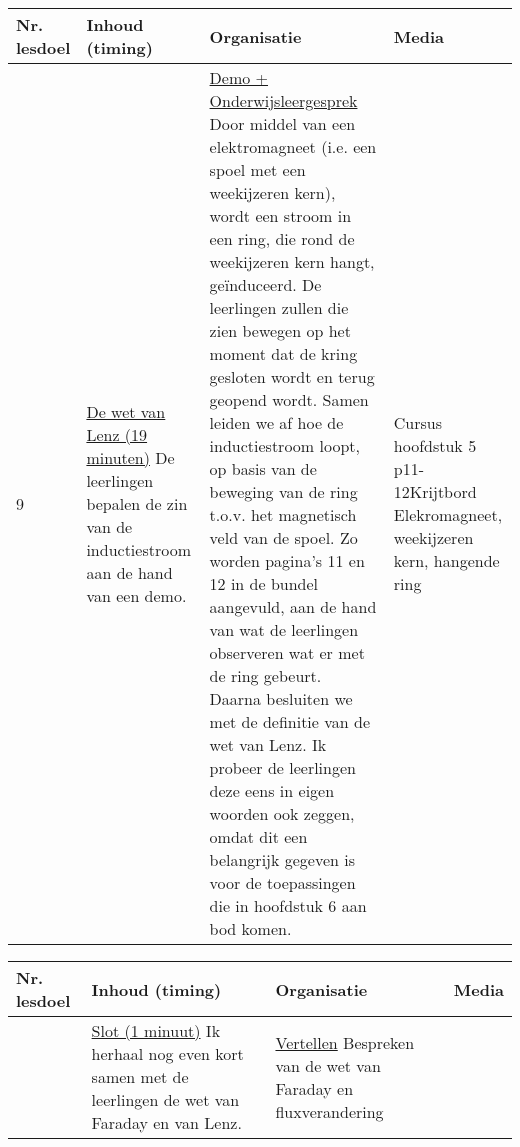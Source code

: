 \begin{landscape}
\begin{tabularx}{1.56\textwidth}{|p{1.5cm}|p{8cm}|X|p{4cm}|}
	\hline
	\textbf{Nr. lesdoel } & \textbf{Inhoud (timing)}  & \textbf{Organisatie } & \textbf{Media } \\ \hline
	9\newline\newline 10&\underline{De wet van Lenz (19 minuten)}\newline
	De leerlingen bepalen de zin van de inductiestroom  aan de hand van een demo.
	&  \underline{Demo + Onderwijsleergesprek}\newline 
	Door middel van een elektromagneet (i.e. een spoel met een weekijzeren kern), wordt een stroom  in een ring, die rond de weekijzeren kern hangt, geïnduceerd. De leerlingen zullen die zien bewegen op het moment dat de kring gesloten wordt en terug geopend wordt. Samen leiden we af hoe de inductiestroom loopt, op basis van de beweging van de ring t.o.v. het magnetisch veld van de spoel. Zo worden pagina's 11 en 12 in de bundel aangevuld, aan de hand van wat de leerlingen observeren wat er met de ring gebeurt. Daarna besluiten we met de definitie van de wet van Lenz. Ik probeer de leerlingen deze eens in eigen woorden ook zeggen, omdat dit een belangrijk gegeven is voor de toepassingen die in hoofdstuk 6 aan bod komen. 
	&   Cursus hoofdstuk 5 p11-12\newline\newline Krijtbord \newline\newline Elekromagneet, weekijzeren kern, hangende ring
	\\ \hline
\end{tabularx}\vspace{5mm}

\begin{tabularx}{1.56\textwidth}{|p{1.5cm}|p{9cm}|X|p{4cm}|}
	\hline
	\textbf{Nr. lesdoel } & \textbf{Inhoud (timing)}  & \textbf{Organisatie } & \textbf{Media } \\ \hline
	& \underline{Slot (1 minuut)}\newline
	Ik herhaal nog even kort samen met de leerlingen de wet van Faraday en van Lenz. 
	&  \underline{Vertellen}\newline 
	Bespreken van de wet van Faraday en fluxverandering
	&  
	\\ \hline
\end{tabularx}




	
\end{landscape}


